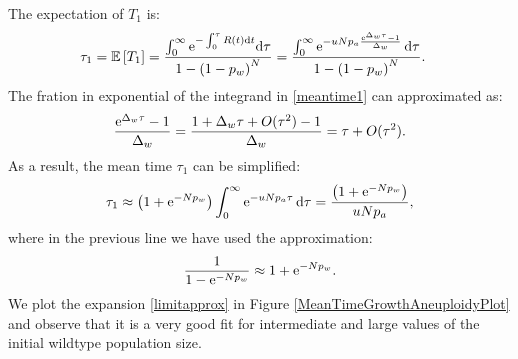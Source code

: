 \documentclass[12pt]{extarticle}
\renewcommand{\d}{{\rm d}}
\newcommand{\e}{{\rm e}}
\begin{document}
The expectation of $T_1$ is:
\begin{align}\label{meantime1}
\tau_1=\mathbb{E}\left[T_1\right]&=\frac{\int_0^\infty\e^{-\int_0^\tau R(t)\d t}\d\tau}{1-\left(1-p_w\right)^N}=\frac{\int_0^\infty\e^{-uNp_a\frac{\e^{\Delta_w\tau}-1}{\Delta_w}}\,\d\tau}{1-\left(1-p_w\right)^N}.
\end{align}
The fration in exponential of the integrand in \eqref{meantime1} can approximated as:
\begin{equation*}
\frac{\e^{\Delta_w\tau}-1}{\Delta_w}=\frac{1+\Delta_w\tau+O(\tau^2)-1}{\Delta_w}=\tau+O(\tau^2).
\end{equation*}
As a result, the mean time $\tau_1$ can be simplified:
\begin{align}\label{limitapprox}
\tau_1\approx\left(1+\e^{-Np_w}\right)\int_0^\infty\e^{-uNp_a\tau}\,\d\tau=\frac{\left(1+\e^{-Np_w}\right)}{uNp_a},
\end{align}
where in the previous line we have used the approximation:
\begin{equation*}
\frac{1}{1-\e^{-Np_w}}\approx1+\e^{-Np_w}.
\end{equation*}
We plot the expansion \eqref{limitapprox} in Figure \ref{MeanTimeGrowthAneuploidyPlot} and observe that it is a very good fit for intermediate and large values of the initial wildtype population size.
\end{document}
